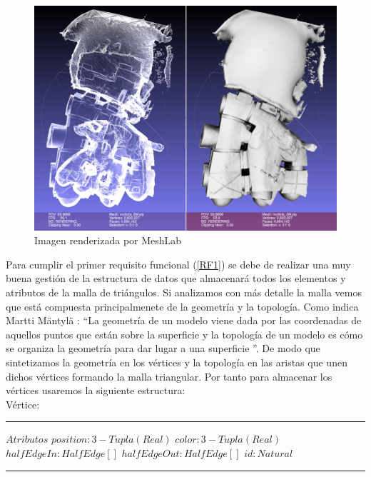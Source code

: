 \begin{figure} %
	\centering
	\includegraphics[scale=0.15]{imagenes/Presentation.jpg} 
	\caption{ Imagen renderizada por MeshLab \cite{cignoniMeshLabOpenSourceMesh2008}} \label{fig:meshlab_presentacion.png}
\end{figure}

Para cumplir el primer requisito funcional (\ref{RF1}) se debe de realizar una muy buena gestión de la estructura de datos que almacenará todos los elementos y atributos de la malla de triángulos. Si analizamos con más detalle la malla vemos que está compuesta principalmenete de la geometría y la topología. Como indica Martti Mäntylä \cite{marttimantylaIntroductionSolidModeling}: \textquotedblleft La geometría de un modelo viene dada por las coordenadas de aquellos puntos que están sobre la superficie y la topología de un modelo es cómo se organiza la geometría para dar lugar a una superficie \textquotedblright. De modo que sintetizamos la geometría en los vértices y la topología en las aristas que unen dichos vértices formando la malla triangular. Por tanto para almacenar los vértices usaremos la siguiente estructura:\\

Vértice:

\begin{algorithmic}
\hrule
	\State $Atributos$
	\State \hspace{1cm} $position : 3-Tupla(Real)$
	\State \hspace{1cm} $color : 3-Tupla(Real)$
	\State \hspace{1cm} $halfEdgeIn : HalfEdge[]$
	\State \hspace{1cm} $halfEdgeOut : HalfEdge[]$
	\State \hspace{1cm} $id : Natural$
\hrule
\end{algorithmic}
\vspace*{1cm}

